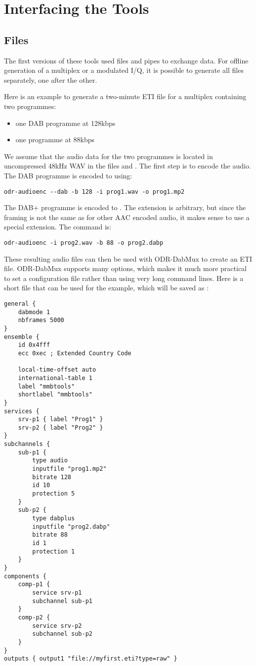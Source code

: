 \section{Interfacing the Tools}
\subsection{Files}
\label{sec-files}
The first versions of these tools used files and pipes to exchange data. For
offline generation of a multiplex or a modulated I/Q, it is possible to
generate all files separately, one after the other.

Here is an example to generate a two-minute ETI file for a multiplex containing
two programmes:
\begin{itemize}
    \item one DAB programme at 128kbps
    \item one \dabplus{} programme at 88kbps
\end{itemize}

We assume that the audio data for the two programmes is located in uncompressed
48kHz WAV in the files  and . The first step
is to encode the audio. The DAB programme is encoded to  using:
\begin{lstlisting}
odr-audioenc --dab -b 128 -i prog1.wav -o prog1.mp2
\end{lstlisting}

The DAB+ programme is encoded to . The extension
 is arbitrary, but since the framing is not the same as for
other AAC encoded audio, it makes sense to use a special extension. The command
is:
\begin{lstlisting}
odr-audioenc -i prog2.wav -b 88 -o prog2.dabp
\end{lstlisting}

These resulting audio files can then be used with ODR-DabMux to create an ETI file.
ODR-DabMux supports many options, which makes it much more practical to set
a configuration file rather than using very long command lines. Here is a short
file that can be used for the example, which will be saved as :
\begin{lstlisting}
general {
    dabmode 1
    nbframes 5000
}
ensemble {
    id 0x4fff
    ecc 0xec ; Extended Country Code

    local-time-offset auto
    international-table 1
    label "mmbtools"
    shortlabel "mmbtools"
}
services {
    srv-p1 { label "Prog1" }
    srv-p2 { label "Prog2" }
}
subchannels {
    sub-p1 {
        type audio
        inputfile "prog1.mp2"
        bitrate 128
        id 10
        protection 5
    }
    sub-p2 {
        type dabplus
        inputfile "prog2.dabp"
        bitrate 88
        id 1
        protection 1
    }
}
components {
    comp-p1 {
        service srv-p1
        subchannel sub-p1
    }
    comp-p2 {
        service srv-p2
        subchannel sub-p2
    }
}
outputs { output1 "file://myfirst.eti?type=raw" }
\end{lstlisting}


